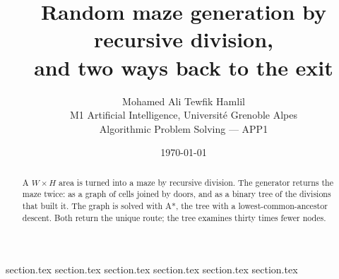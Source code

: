 \documentclass[11pt,a4paper]{article}
\title{Random maze generation by recursive division,\\
       and two ways back to the exit}
\author{Mohamed Ali Tewfik Hamlil\\[2pt]
  \small M1 Artificial Intelligence, Universit\'e Grenoble Alpes\\
  \small Algorithmic Problem Solving --- APP1}
\date{\today}
\begin{document}
\maketitle

\begin{abstract}
A $W\times H$ area is turned into a maze by recursive division. The generator
returns the maze twice: as a graph of cells joined by doors, and as a binary
tree of the divisions that built it. The graph is solved with A*, the tree with
a lowest-common-ancestor descent. Both return the unique route; the tree
examines thirty times fewer nodes.
\end{abstract}

\tableofcontents
\clearpage

{section.tex}
{section.tex}
{section.tex}
{section.tex}
{section.tex}
{section.tex}



\end{document}
